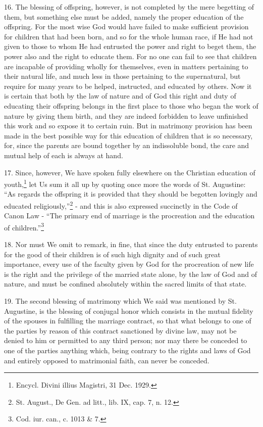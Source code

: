 \documentclass[12pt,a4paper]{book}
\begin{document}
16. The blessing of offspring, however, is not completed by the mere begetting of them, but something else must be added, namely the proper education of the offspring. For the most wise God would have failed to make sufficient provision for children that had been born, and so for the whole human race, if He had not given to those to whom He had entrusted the power and right to beget them, the power also and the right to educate them. For no one can fail to see that children are incapable of providing wholly for themselves, even in matters pertaining to their natural life, and much less in those pertaining to the supernatural, but require for many years to be helped, instructed, and educated by others. Now it is certain that both by the law of nature and of God this right and duty of educating their offspring belongs in the first place to those who began the work of nature by giving them birth, and they are indeed forbidden to leave unfinished this work and so expose it to certain ruin. But in matrimony provision has been made in the best possible way for this education of children that is so necessary, for, since the parents are bound together by an indissoluble bond, the care and mutual help of each is always at hand.

17. Since, however, We have spoken fully elsewhere on the Christian education of youth,\footnote{Encycl. Divini illius Magistri, 31 Dec. 1929.} let Us sum it all up by quoting once more the words of St. Augustine: ``As regards the offspring it is provided that they should be begotten lovingly and educated religiously,''\footnote{St. August., De Gen. ad litt., lib. IX, cap. 7, n. 12.} - and this is also expressed succinctly in the Code of Canon Law - ``The primary end of marriage is the procreation and the education of children.''\footnote{Cod. iur. can., c. 1013 \& 7.}

18. Nor must We omit to remark, in fine, that since the duty entrusted to parents for the good of their children is of such high dignity and of such great importance, every use of the faculty given by God for the procreation of new life is the right and the privilege of the married state alone, by the law of God and of nature, and must be confined absolutely within the sacred limits of that state.

19. The second blessing of matrimony which We said was mentioned by St. Augustine, is the blessing of conjugal honor which consists in the mutual fidelity of the spouses in fulfilling the marriage contract, so that what belongs to one of the parties by reason of this contract sanctioned by divine law, may not be denied to him or permitted to any third person; nor may there be conceded to one of the parties anything which, being contrary to the rights and laws of God and entirely opposed to matrimonial faith, can never be conceded.
\end{document}
